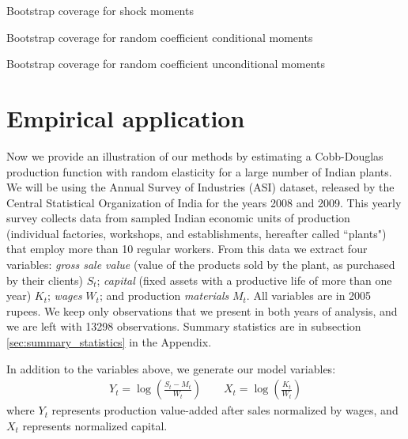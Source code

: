 \begin{table}[H]
  \singlespacing
  \caption{Bootstrap coverage for shock moments}
  
  \label{tab:bs_coverage_shocks}
\end{table}

\begin{table}[H]
  \singlespacing
  \caption{Bootstrap coverage for random coefficient conditional moments}
  
  \label{tab:bs_conditional_coverage}
\end{table}

\begin{table}[H]
  \singlespacing
  \caption{Bootstrap coverage for random coefficient unconditional moments}
  
  \label{tab:bs_coverage_random_coefficients}
\end{table}

\section{Empirical application}

Now we provide an illustration of our methods by estimating a Cobb-Douglas production function with random elasticity for a large number of Indian plants. We will be using the Annual Survey of Industries (ASI) dataset, released by the Central Statistical Organization of India for the years 2008 and 2009. This yearly survey collects data from sampled Indian economic units of production (individual factories, workshops, and establishments, hereafter called ``plants") that employ more than 10 regular workers. From this data we extract four variables: \emph{gross sale value} (value of the products sold by the plant, as purchased by their clients) $S_{t}$; \emph{capital} (fixed assets with a productive life of more than one year) $K_{t}$; \emph{wages} $W_{t}$; and production \emph{materials} $M_{t}$. All variables are in 2005 rupees. We keep only observations that we present in both years of analysis, and we are left with 13298 observations. Summary statistics are in subsection \ref{sec:summary_statistics} in the Appendix.


In addition to the variables above, we generate our model variables:
\begin{align}
  Y_{t} = \log\left( \frac{S_{t} - M_{t}}{W_{t}}\right) \qquad X_{t} = \log \left( \frac{K_{t}}{W_{t}} \right)
\end{align}
\noindent where $Y_{t}$ represents production value-added after sales normalized by wages, and $X_t$ represents normalized capital. 

